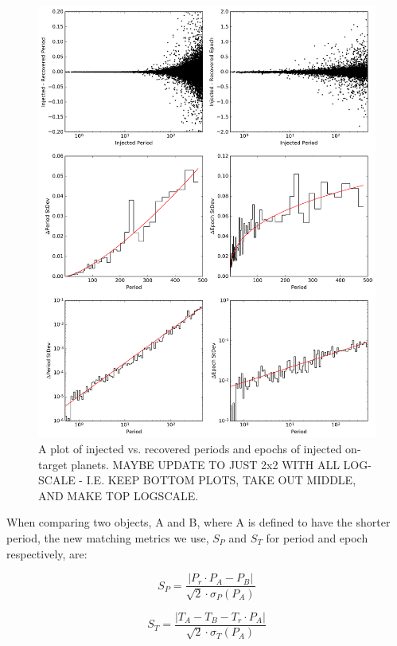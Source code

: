 \begin{figure}[h]
\centering
\includegraphics[width=\linewidth]{DR25-Injected-Vs-Recovered-Periods-And-Epochs.png}
\caption{A plot of injected vs. recovered periods and epochs of injected on-target planets. MAYBE UPDATE TO JUST 2x2 WITH ALL LOG-SCALE - I.E. KEEP BOTTOM PLOTS, TAKE OUT MIDDLE, AND MAKE TOP LOGSCALE.}
\label{injephemfig}
\end{figure}


When comparing two objects, A and B, where A is defined to have the shorter period, the new matching metrics we use, $S_{P}$ and $S_{T}$ for period and epoch respectively, are:

\begin{equation}
    S_{P} = \frac{\left|P_{r} \cdot P_{A} - P_{B}\right|}{\sqrt{2}\cdot\sigma_{P}(P_{A})}
\end{equation}

\begin{equation}
    S_{T} = \frac{\left| T_{A} - T_{B} - T_{r} \cdot P_{A}\right|}{\sqrt{2}\cdot\sigma_{T}(P_{A})}
\end{equation}

